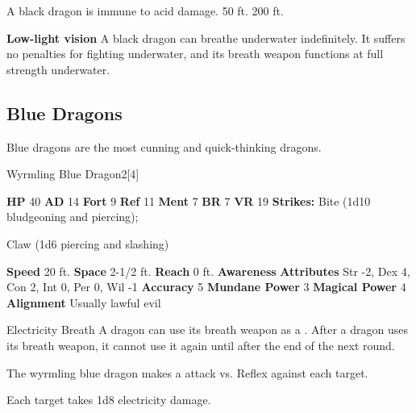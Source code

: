       
       A black dragon is immune to acid damage.
     50 ft.
     200 ft.
    \par\noindent\textbf{Low-light vision}
        A black dragon can breathe underwater indefinitely.
        It suffers no penalties for fighting underwater, and its breath weapon functions at full strength underwater.
  
  
    \subsection{Blue Dragons}
      
      Blue dragons are the most cunning and quick-thinking dragons.
    

      
  \begin{monsubsection}{Wyrmling Blue Dragon}{2}[4]
    \vspace{-1em}\vspace{-1em}
    \vspace{0em}

    
    

    \begin{spellcontent}
      \begin{spelltargetinginfo}
        \pari \textbf{HP} 40 \monsep
          \textbf{AD} 14 \monsep
          \textbf{Fort} 9 \monsep
          \textbf{Ref} 11 \monsep
          \textbf{Ment} 7
        \pari \textbf{BR} 7 \monsep
        \textbf{VR} 19
        \pari \textbf{Strikes:}
            Bite  (1d10 bludgeoning and piercing);
\par Claw  (1d6 piercing and slashing)
      \end{spelltargetinginfo}
    \end{spellcontent}
    \begin{monsterfooter}
      \pari \textbf{Speed} 20 ft. \monsep
        \textbf{Space} 2-1/2 ft. \monsep
        \textbf{Reach} 0 ft.
      \pari \textbf{Awareness} 
      \pari \textbf{Attributes}
        Str -2, Dex 4,
        Con 2, Int 0,
        Per 0, Wil -1
      \pari \textbf{Accuracy} 5 \monsep
        \textbf{Mundane Power} 3 \monsep
      \textbf{Magical Power} 4
      \pari \textbf{Alignment} Usually lawful evil
    \end{monsterfooter}
  \end{monsubsection}
  \begin{freeability}{Electricity Breath}
      A dragon can use its breath weapon as a .
      After a dragon uses its breath weapon, it cannot use it again until after the end of the next round.
      \par The wyrmling blue dragon makes a  attack
        vs. Reflex against each target.
    
    \hit Each target takes 1d8 electricity damage.
    \end{freeability}
  
